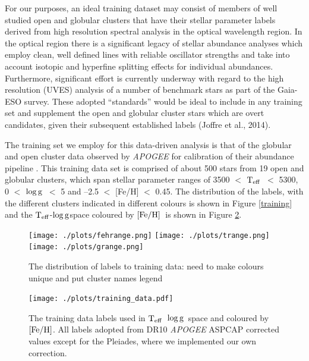 \documentclass[12pt, preprint]{aastex}
\newcommand{\teff}{\mbox{$\rm T_{eff}$}}
\newcommand{\feh}{\mbox{$\rm [Fe/H]$}}
\newcommand{\logg}{\mbox{$\rm \log g$}}
\begin{document}
For our purposes, an ideal training dataset may consist of members of
well studied open and globular clusters that have their stellar
parameter labels derived from high resolution spectral analysis in the
optical wavelength region.
In the optical region there is a significant legacy of stellar abundance analyses which employ clean, well defined lines with reliable oscillator strengths and take into account isotopic and hyperfine splitting effects for individual abundances. Furthermore, significant effort is currently underway with regard to the high resolution (UVES) analysis of a number of benchmark stars as part of the Gaia-ESO survey. These adopted ``standards'' would be ideal to include in any training set and supplement the open and globular cluster stars which are overt candidates, given their subsequent established labels (Joffre et al., 2014). %

The training set we employ for this data-driven analysis is that of the globular and open cluster data observed by \textit{APOGEE} for calibration of their abundance pipeline \citep{Meszaros2013}. This training data set is comprised of about 500 stars from 19 open and globular clusters, which span stellar parameter ranges of 3500 $<$ \teff\ $<$ 5300, 0 $<$ \logg\ $<$ 5 and --2.5 $<$ [Fe/H] $<$ 0.45. The distribution of the labels, with the different clusters indicated in different colours is shown in Figure \ref{training} and the \teff-\logg space coloured by \feh\ is shown in Figure \ref{fig:training_tgfeh}. 

\begin{figure}[h!]
  \texttt{[image: ./plots/fehrange.png]}
    \texttt{[image: ./plots/trange.png]}
      \texttt{[image: ./plots/grange.png]}
  \caption{The distribution of labels to training data: need to make colours unique and put cluster names legend}
\label{fig:training}
\end{figure}

\begin{figure}[h!]
\centering
  \texttt{[image: ./plots/training\_data.pdf]}
\caption{The training data labels used in \teff\, \logg\ space and coloured by \feh. All labels adopted from DR10 \textit{APOGEE} ASPCAP corrected values except for the Pleiades, where we implemented our own correction. }
\label{fig:training_tgfeh}
\end{figure}
\end{document}
